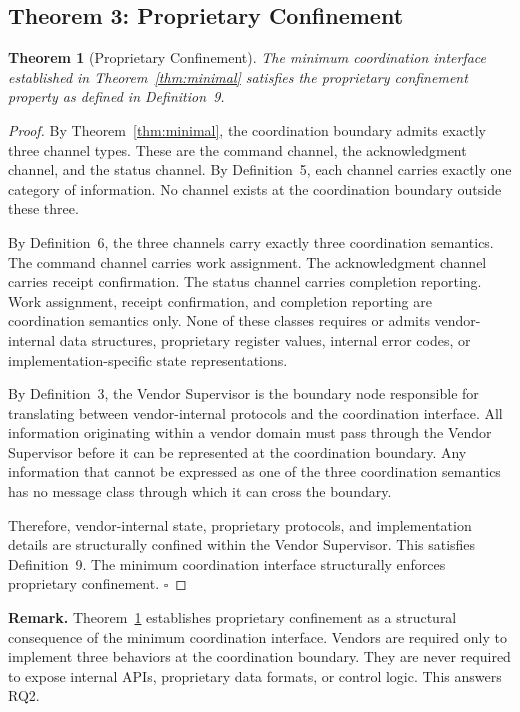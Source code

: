 \documentclass[a4paper,fleqn]{cas-dc}
\newtheorem{theorem}{Theorem}
\begin{document}
\subsection{Theorem 3: Proprietary Confinement}

\begin{theorem}[Proprietary Confinement]
\label{thm:confinement}
The minimum coordination interface established in Theorem~\ref{thm:minimal} satisfies the proprietary confinement property as defined in Definition~9.
\end{theorem}

\begin{proof}
By Theorem~\ref{thm:minimal}, the coordination boundary admits exactly three channel types. These are the command channel, the acknowledgment channel, and the status channel. By Definition~5, each channel carries exactly one category of information. No channel exists at the coordination boundary outside these three.

By Definition~6, the three channels carry exactly three coordination semantics. The command channel carries work assignment. The acknowledgment channel carries receipt confirmation. The status channel carries completion reporting. Work assignment, receipt confirmation, and completion reporting are coordination semantics only. None of these classes requires or admits vendor-internal data structures, proprietary register values, internal error codes, or implementation-specific state representations.

By Definition~3, the Vendor Supervisor is the boundary node responsible for translating between vendor-internal protocols and the coordination interface. All information originating within a vendor domain must pass through the Vendor Supervisor before it can be represented at the coordination boundary. Any information that cannot be expressed as one of the three coordination semantics has no message class through which it can cross the boundary.

Therefore, vendor-internal state, proprietary protocols, and implementation details are structurally confined within the Vendor Supervisor. This satisfies Definition~9. The minimum coordination interface structurally enforces proprietary confinement. \hfill$\square$
\end{proof}

\noindent\textbf{Remark.} Theorem~\ref{thm:confinement} establishes proprietary confinement as a structural consequence of the minimum coordination interface. Vendors are required only to implement three behaviors at the coordination boundary. They are never required to expose internal APIs, proprietary data formats, or control logic. This answers RQ2.
\end{document}
